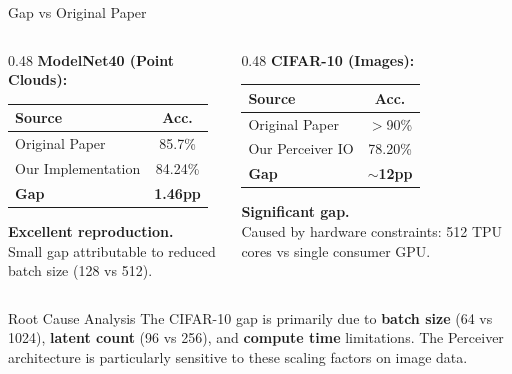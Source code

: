 \documentclass[aspectratio=169,11pt]{beamer}
\begin{document}
\begin{frame}[shrink=10]{Gap vs Original Paper}
  \begin{columns}[T]
    \begin{column}{0.48\textwidth}
      \textbf{ModelNet40 (Point Clouds):}
      \begin{table}
        \centering\small
        \begin{tabular}{lc}
          \toprule
          \textbf{Source} & \textbf{Acc.} \\
          \midrule
          Original Paper & 85.7\% \\
          Our Implementation & 84.24\% \\
          \midrule
          \textbf{Gap} & \textcolor{AccentGreen}{\textbf{1.46pp}} \\
          \bottomrule
        \end{tabular}
      \end{table}

      \vspace{0.3em}
      \textcolor{AccentGreen}{\textbf{Excellent reproduction.}}\\
      Small gap attributable to reduced batch size (128 vs 512).
    \end{column}
    \begin{column}{0.48\textwidth}
      \textbf{CIFAR-10 (Images):}
      \begin{table}
        \centering\small
        \begin{tabular}{lc}
          \toprule
          \textbf{Source} & \textbf{Acc.} \\
          \midrule
          Original Paper & $>$90\% \\
          Our Perceiver IO & 78.20\% \\
          \midrule
          \textbf{Gap} & \textcolor{AccentRed}{\textbf{$\sim$12pp}} \\
          \bottomrule
        \end{tabular}
      \end{table}

      \vspace{0.3em}
      \textcolor{AccentRed}{\textbf{Significant gap.}}\\
      Caused by hardware constraints: 512 TPU cores vs single consumer GPU.
    \end{column}
  \end{columns}

  \vspace{0.5em}
  \begin{block}{Root Cause Analysis}
    The CIFAR-10 gap is primarily due to \textbf{batch size} (64 vs 1024), \textbf{latent count} (96 vs 256), and \textbf{compute time} limitations. The Perceiver architecture is particularly sensitive to these scaling factors on image data.
  \end{block}
\end{frame}
\end{document}
